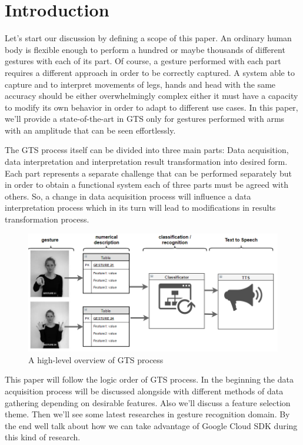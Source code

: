 \documentclass[conference,compsoc]{IEEEtran}
\begin{document}
\IEEEpeerreviewmaketitle

\section{Introduction}
Let's start our discussion by defining a scope of this paper. An ordinary human body is flexible enough to perform a hundred or maybe thousands of different gestures with each of its part. Of course, a gesture performed with each part requires a different approach in order to be correctly captured. A system able to capture and to interpret movements of legs, hands and head with the same accuracy should be either overwhelmingly complex either it must have a capacity to modify its own behavior in order to adapt to different use cases.  In this paper, we'll provide a state-of-the-art in GTS only for gestures performed with arms with an amplitude that can be seen effortlessly.

The GTS process itself can be divided into three main parts: Data acquisition, data interpretation and interpretation result transformation into desired form. Each part represents a separate challenge that can be performed separately but in order to obtain a functional system each of three parts must be agreed with others. So, a change in data acquisition process will influence a data interpretation process which in its turn will lead to modifications in results transformation process.  

\begin{figure}[h]
\caption{A high-level overview of GTS process}
\includegraphics[scale=0.35]{gts_overview}
\centering
\end{figure}

This paper will follow the logic order of GTS process. In the beginning the data acquisition process will be discussed alongside with different methods of data gathering depending on desirable features. Also we'll discuss a feature selection theme. Then we'll see some latest researches in gesture recognition domain. By the end well talk about how we can take advantage of Google Cloud SDK during this kind of research.
\end{document}
